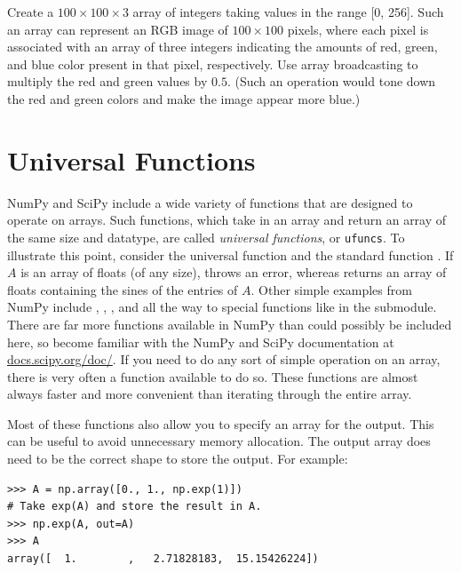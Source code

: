 \begin{problem}
Create a $100\times100\times3$ array of integers taking values in the range 
[0, 256]. Such an array can represent an RGB image of $100\times100$ pixels, 
where each pixel is associated with an array of three integers indicating the 
amounts of red, green, and blue color present in that pixel, respectively.
Use array broadcasting to multiply the red and green values by $0.5$. 
(Such an operation would tone down the red and green colors and make the 
image appear more blue.) 
\end{problem}

\section*{Universal Functions}
NumPy and SciPy include a wide variety of functions that are designed to 
operate on arrays. Such functions, which take in an array and return an array 
of the same size and datatype, are called \emph{universal functions}, or 
\texttt{ufuncs}. To illustrate this point, consider the universal function 
 and the standard function . If $A$ is an array 
of floats (of any size),  throws an error, whereas 
 returns an array of floats containing the sines of the 
entries of $A$. Other simple examples from NumPy include , , 
, and  all the way to special functions like  
in the  submodule. There are far more functions available in 
NumPy than could possibly be included here, so become 
familiar with the NumPy and SciPy documentation at \url{docs.scipy.org/doc/}.
If you need to do any sort of simple operation on an array, there is very 
often a function available to do so. These functions are almost always faster and 
more convenient than iterating through the entire array.

Most of these functions also allow you to specify an array for the output.
This can be useful to avoid unnecessary memory allocation. The output array does need to be the correct shape 
to store the output.
For example:

\begin{lstlisting}
>>> A = np.array([0., 1., np.exp(1)])
# Take exp(A) and store the result in A.
>>> np.exp(A, out=A) 
>>> A
array([  1.        ,   2.71828183,  15.15426224])
\end{lstlisting}

